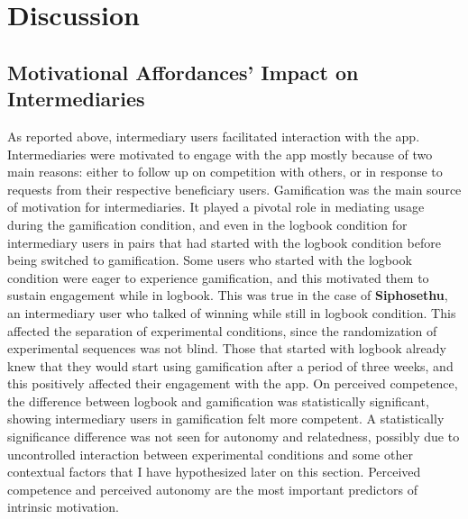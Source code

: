 \section{Discussion}
\subsection{Motivational Affordances' Impact on Intermediaries}
As reported above, intermediary users facilitated interaction with the app. Intermediaries were motivated to engage with the app mostly because of two main reasons: either to follow up on competition with others, or in response to requests from their respective beneficiary users. Gamification was the main source of motivation for intermediaries. It played a pivotal role in mediating usage during the gamification condition, and even in the logbook condition for intermediary users in pairs that had started with the logbook condition before being switched to gamification. Some users who started with the logbook condition were eager to experience gamification, and this motivated them to sustain engagement while in logbook. This was true in the case of \textbf{Siphosethu}, an intermediary user who talked of winning while still in logbook condition. This affected the separation of experimental conditions, since the randomization of experimental sequences was not blind. Those that started with logbook already knew that they would start using gamification after a period of three weeks, and this positively affected their engagement with the app. On perceived competence, the difference between logbook and gamification was statistically significant, showing intermediary users in gamification felt more competent. A statistically significance difference was not seen for autonomy and relatedness, possibly due to uncontrolled interaction between experimental conditions and some other contextual factors that I have hypothesized later on this section. Perceived competence and perceived autonomy are the most important predictors of intrinsic motivation. 

